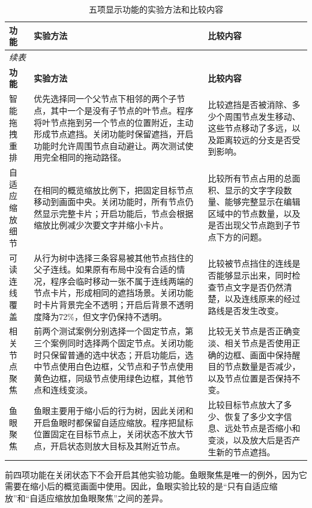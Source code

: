 \documentclass[11pt,a4paper,oneside,extrafontsizes]{memoir}
\begin{document}
\begin{center}
\small
\begin{longtable}{@{}p{} p{} p{}@{}}
\caption{五项显示功能的实验方法和比较内容}\label{tab:auto-3}\\
\toprule
\textbf{功能} & \textbf{实验方法} & \textbf{比较内容} \\
\midrule
\endfirsthead
\multicolumn{3}{l}{\small\itshape 续表}\\
\toprule
\textbf{功能} & \textbf{实验方法} & \textbf{比较内容} \\
\midrule
\endhead
智能拖拽重排 & 优先选择同一个父节点下相邻的两个子节点，其中一个是没有子节点的叶节点。程序将叶节点拖到另一个节点的位置附近，主动形成节点遮挡。关闭功能时保留遮挡，开启功能时允许周围节点自动避让。两次测试使用完全相同的拖动路径。 & 比较遮挡是否被消除、多少个周围节点发生移动、这些节点移动了多远，以及距离较远的分支是否受到影响。 \\
自适应缩放细节 & 在相同的概览缩放比例下，把固定目标节点移动到画面中央。关闭功能时，所有节点仍然显示完整卡片；开启功能后，节点会根据缩放比例减少次要文字并缩小卡片。 & 比较所有节点占用的总面积、显示的文字字段数量、能够完整显示在编辑区域中的节点数量，以及是否出现父节点跑到子节点下方的问题。 \\
可读连线覆盖 & 从行为树中选择三条容易被其他节点挡住的父子连线。如果原有布局中没有合适的情况，程序会临时移动一张不属于连线两端的节点卡片，形成相同的遮挡场景。关闭功能时卡片背景完全不透明；开启后背景不透明度降为72\%，但文字仍保持不透明。 & 比较被节点挡住的连线是否能够显示出来，同时检查节点文字是否仍然清楚，以及连线原来的经过路线是否发生改变。 \\
相关节点聚焦 & 前两个测试案例分别选择一个固定节点，第三个案例同时选择两个固定节点。关闭功能时只保留普通的选中状态；开启功能后，选中节点使用白色边框，父节点和子节点使用黄色边框，同级节点使用绿色边框，其他节点和连线变淡。 & 比较无关节点是否正确变淡、相关节点是否使用正确的边框、画面中保持醒目的节点数量是否减少，以及节点位置是否保持不变。 \\
鱼眼聚焦 & 鱼眼主要用于缩小后的行为树，因此关闭和开启鱼眼时都保留自适应缩放。程序把鼠标位置固定在目标节点上，关闭状态不放大节点，开启状态则放大目标及其附近节点。 & 比较目标节点放大了多少、恢复了多少文字信息、远处节点是否缩小和变淡，以及放大后是否产生新的节点遮挡。 \\
\bottomrule
\end{longtable}
\end{center}

前四项功能在关闭状态下不会开启其他实验功能。鱼眼聚焦是唯一的例外，因为它需要在缩小后的概览画面中使用。因此，鱼眼实验比较的是“只有自适应缩放”和“自适应缩放加鱼眼聚焦”之间的差异。
\end{document}

